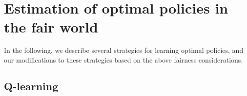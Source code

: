 \documentclass{article}
\begin{document}




\section{Estimation of optimal policies in the fair world} 
\label{sec:estfairpolicy}
In the following, we describe several strategies for learning optimal policies, and our modifications to these strategies based on the above fairness considerations.



\subsection{Q-learning} 
\end{document}
